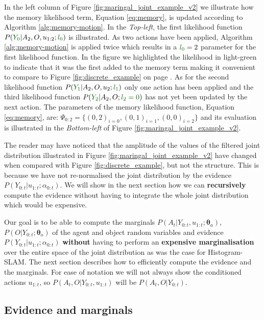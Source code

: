 \documentclass{frontiersSCNS} %
\newcommand*{\mathcolor}{}
\def\mathcolor#1#{\mathcoloraux{#1}}
\newcommand*{\mathcoloraux}[3]{%
  \protect\leavevmode
  \begingroup
    \color#1{#2}#3%
  \endgroup
}
\newcommand{\ThA}{\boldsymbol{\theta}_a}
\newcommand{\ThO}{\boldsymbol{\theta}_o}
\begin{document}
In the left column of Figure \ref{fig:maringal_joint_example_v2} we illustrate how the memory likelihood term, Equation \ref{eq:memory}, 
is updated according to Algorithm \ref{alg:memory-motion}. In the \textit{Top-left}, the first likelihood function 
$P(\mathcolor{dark-green}{Y_0}|A_2,O,u_{1:2};\mathcolor{dark-green}{l_0})$ is illustrated. As two actions have been applied, Algorithm \ref{alg:memory-motion} is applied 
twice which results in a $\mathcolor{dark-green}{l_0}=2$ parameter for the first likelihood function. In the figure we highlighted the likelihood in light-green 
to indicate that it was the first added to the memory term making it convenient to compare to Figure \ref{fig:discrete_example} on page \pageref{fig:discrete_example}. As for the second 
likelihood function $P(\mathcolor{dark-green}{Y_1}|A_2,O,u_{2};\mathcolor{dark-green}{l_1})$ only one action has been applied and the third likelihood 
function $P(\mathcolor{dark-green}{Y_2}|A_2,O;\mathcolor{dark-green}{l_2=0})$ has not yet been updated by the next action. 
The parameters of the memory likelihood function, Equation \ref{eq:memory}, are: $\Psi_{0:2} = \{(0,2)_{i=0},(0,1)_{i=1},(0,0)_{i=2}\}$ and its evaluation 
is illustrated in the \textit{Bottom-left} of Figure \ref{fig:maringal_joint_example_v2}. 
  
The reader may have noticed that the amplitude of the values of the filtered joint distribution illustrated in Figure \ref{fig:maringal_joint_example_v2} have changed
when compared with Figure \ref{fig:discrete_example}, but not the structure. This is because we have not re-normalised the joint distribution by the evidence $P(Y_{0:t}|u_{1:t};\alpha_{0:t})$. We will show 
in the next section how we can \textbf{recursively} compute the evidence without having to integrate the whole joint distribution which would be 
expensive.

Our goal is to be able to compute the marginals $P(A_t|Y_{0:t},u_{1:t};\ThA)$, $P(O|Y_{0:t};\ThO)$ of the agent and object random variables and 
evidence $P(Y_{0:t}|u_{1:t};\alpha_{0:t})$ \textbf{without} having to perform an \textbf{expensive marginalisation} over the entire space of the joint distribution 
as was the case for Histogram-SLAM.  The next section describes how to efficiently compute the evidence and the marginals.
For ease of notation we will not always show the conditioned actions $u_{1:t}$, so $P(A_t,O|Y_{0:t},u_{1:t})$ will 
be $P(A_t,O|Y_{0:t})$.

\subsection{Evidence and marginals}
\end{document}
